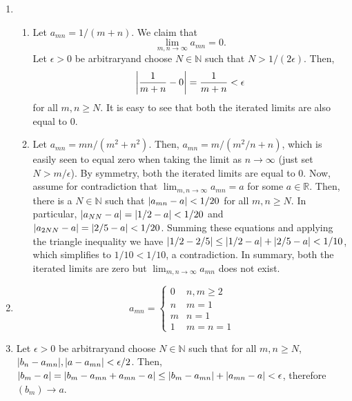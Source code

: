 \documentclass{article}
\DeclarePairedDelimiter\abs{\lvert}{\rvert}
\newcommand{\N}{\mathbb{N}}
\newcommand{\R}{\mathbb{R}}
\newcommand{\ra}{\rightarrow}
\newcommand{\lep}[1][L]{#1et $\epsilon > 0$ be arbitrary}
\begin{document}
\begin{enumerate}
\begin{enumerate}
	\item \begin{enumerate}
	\item Let $a_{mn} = 1/(m+n)$. We claim that \begin{equation*}
	      \lim_{m, n \ra \infty} a_{mn} = 0.
	\end{equation*} \lep \space and choose $N \in \N$ such that $N > 1/(2\epsilon)$. Then, \begin{equation*}
	\abs*{\frac{1}{m+n} - 0} = \frac{1}{m+n} < \epsilon
	\end{equation*} for all $m,n \geq N$. It is easy to see that both the iterated limits are also equal to $0$.
			        
	\item Let $a_{mn}= mn/(m^2+n^2)$. Then, $a_{mn} = m/(m^2/n+n)$, which is easily seen to equal zero when taking the limit as $n \ra \infty$ (just set $N > m/\epsilon$). By symmetry, both the iterated limits are equal to $0$. Now, assume for contradiction that $\lim_{m,n \ra \infty} a_{mn}= a$ for some $a \in \R$. Then, there is a $N \in \N$ such that $\abs*{a_{mn} - a}  < 1/20$ for all $m,n \geq N$. In particular, $\abs*{a_{NN}-a} = \abs*{1/2-a} < 1/20$ and $\abs*{a_{2N N} - a} = \abs*{2/5-a} < 1/20$. Summing these equations and applying the triangle inequality we have $\abs*{1/2-2/5}\leq \abs*{1/2-a}+\abs*{2/5-a}<1/10$, which simplifies to $1/10 < 1/10$, a contradiction. In summary, both the iterated limits are zero but $\lim_{m,n \ra \infty} a_{mn}$ does not exist.
\end{enumerate}
	    
    \item \begin{equation*}
    a_{mn} = \begin{cases}
    0 & n,m \geq 2 \\
    n & m = 1 \\
    m & n = 1 \\
    1 & m = n = 1
    \end{cases}
    \end{equation*}
    	        
    \item \lep \space and choose $N \in \N$ such that for all $m,n \geq N$, $\abs*{b_n-a_{mn}}, \abs*{a-a_{mn}} < \epsilon/2$. Then, $\abs*{b_m-a} = \abs*{b_m-a_{mn} + a_{mn} - a} \leq \abs*{b_m-a_{mn}} + \abs*{a_{mn}-a} < \epsilon$, therefore $(b_m) \ra a$.
    \end{enumerate}
    	

\end{enumerate}
\end{document}
